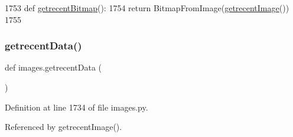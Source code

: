 \begin{DoxyCode}
1753 \textcolor{keyword}{def }\hyperlink{namespaceimages_ae7e23a7d49c169647126d3c9e2b3eb0f}{getrecentBitmap}():
1754     \textcolor{keywordflow}{return} BitmapFromImage(\hyperlink{namespaceimages_aee17f3301429c42b24577517bb7a12bd}{getrecentImage}())
1755 
\end{DoxyCode}
\mbox{\label{namespaceimages_a9d897eaa85415fba9658c4642f1f2152}} 
\subsubsection{\texorpdfstring{getrecent\+Data()}{getrecentData()}}
{\footnotesize\ttfamily def images.\+getrecent\+Data (\begin{DoxyParamCaption}{ }\end{DoxyParamCaption})}



Definition at line 1734 of file images.\+py.



Referenced by getrecent\+Image().


